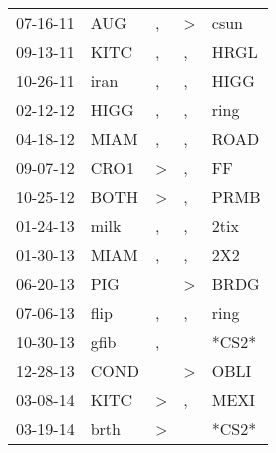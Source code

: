 \begin{supertabular}{p{0.07\textwidth}p{0.06\textwidth}p{0.02\textwidth}p{0.02\textwidth}p{0.06\textwidth}}
 07-16-11\textsuperscript{} &            AUG\textsuperscript{} &                , &     \textgreater &           csun\textsuperscript{} \\
 09-13-11\textsuperscript{} &           KITC\textsuperscript{} &                , &                , &           HRGL\textsuperscript{} \\
 10-26-11\textsuperscript{} &           iran\textsuperscript{} &                , &                , &           HIGG\textsuperscript{} \\
 02-12-12\textsuperscript{} &           HIGG\textsuperscript{} &                , &                , &           ring\textsuperscript{} \\
 04-18-12\textsuperscript{} &           MIAM\textsuperscript{} &                , &                , &           ROAD\textsuperscript{} \\
 09-07-12\textsuperscript{} &           CRO1\textsuperscript{} &     \textgreater &                , &             FF\textsuperscript{} \\
 10-25-12\textsuperscript{} &           BOTH\textsuperscript{} &     \textgreater &                , &           PRMB\textsuperscript{} \\
 01-24-13\textsuperscript{} &           milk\textsuperscript{} &                , &                , &           2tix\textsuperscript{} \\
 01-30-13\textsuperscript{} &           MIAM\textsuperscript{} &                , &                , &            2X2\textsuperscript{} \\
 06-20-13\textsuperscript{} &            PIG\textsuperscript{} &                  &     \textgreater &           BRDG\textsuperscript{} \\
 07-06-13\textsuperscript{} &           flip\textsuperscript{} &                , &                , &           ring\textsuperscript{} \\
 10-30-13\textsuperscript{} &           gfib\textsuperscript{} &                , &                  &                            *CS2* \\
 12-28-13\textsuperscript{} &           COND\textsuperscript{} &                  &     \textgreater &           OBLI\textsuperscript{} \\
 03-08-14\textsuperscript{} &           KITC\textsuperscript{} &     \textgreater &                , &           MEXI\textsuperscript{} \\
 03-19-14\textsuperscript{} &           brth\textsuperscript{} &     \textgreater &                  &                            *CS2* \\

\end{supertabular}
